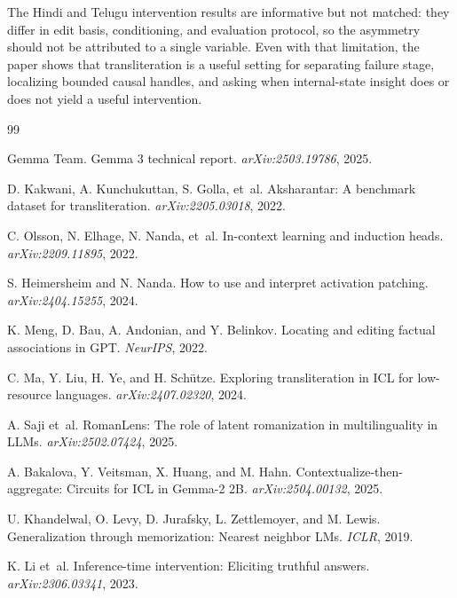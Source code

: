 \documentclass{article}
\begin{document}
The Hindi and Telugu intervention results are informative but not matched: they differ in edit basis, conditioning, and evaluation protocol, so the asymmetry should not be attributed to a single variable. Even with that limitation, the paper shows that transliteration is a useful setting for separating failure stage, localizing bounded causal handles, and asking when internal-state insight does or does not yield a useful intervention.

\begin{thebibliography}{99}

Gemma Team. Gemma 3 technical report. \emph{arXiv:2503.19786}, 2025.

D. Kakwani, A. Kunchukuttan, S. Golla, et~al. Aksharantar: A benchmark dataset for transliteration. \emph{arXiv:2205.03018}, 2022.

C. Olsson, N. Elhage, N. Nanda, et~al. In-context learning and induction heads. \emph{arXiv:2209.11895}, 2022.

S. Heimersheim and N. Nanda. How to use and interpret activation patching. \emph{arXiv:2404.15255}, 2024.

K. Meng, D. Bau, A. Andonian, and Y. Belinkov. Locating and editing factual associations in GPT. \emph{NeurIPS}, 2022.

C. Ma, Y. Liu, H. Ye, and H. Sch\"utze. Exploring transliteration in ICL for low-resource languages. \emph{arXiv:2407.02320}, 2024.

A. Saji et~al. RomanLens: The role of latent romanization in multilinguality in LLMs. \emph{arXiv:2502.07424}, 2025.

A. Bakalova, Y. Veitsman, X. Huang, and M. Hahn. Contextualize-then-aggregate: Circuits for ICL in Gemma-2 2B. \emph{arXiv:2504.00132}, 2025.

U. Khandelwal, O. Levy, D. Jurafsky, L. Zettlemoyer, and M. Lewis. Generalization through memorization: Nearest neighbor LMs. \emph{ICLR}, 2019.

K. Li et~al. Inference-time intervention: Eliciting truthful answers. \emph{arXiv:2306.03341}, 2023.


\end{thebibliography}
\end{document}
